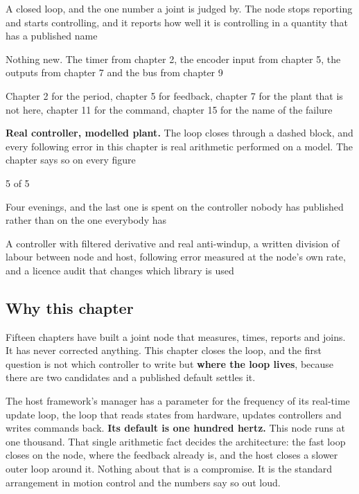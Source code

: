 
\begin{keyfacts}
\item[Adds to the node] A closed loop, and the one number a joint is judged by.
The node stops reporting and starts controlling, and it reports how well it is
controlling in a quantity that has a published name
\item[Peripherals] Nothing new. The timer from chapter 2, the encoder input from
chapter 5, the outputs from chapter 7 and the bus from chapter 9
\item[Depends on] Chapter 2 for the period, chapter 5 for feedback, chapter 7
for the plant that is not here, chapter 11 for the command, chapter 15 for the
name of the failure
\item[Real or modelled] \textbf{Real controller, modelled plant.} The loop
closes through a dashed block, and every following error in this chapter is real
arithmetic performed on a model. The chapter says so on every figure
\item[Difficulty] 5 of 5
\item[Effort] Four evenings, and the last one is spent on the controller nobody
has published rather than on the one everybody has
\item[Deliverable] A controller with filtered derivative and real anti-windup, a
written division of labour between node and host, following error measured at
the node's own rate, and a licence audit that changes which library is used
\end{keyfacts}

\subsection*{Why this chapter}

Fifteen chapters have built a joint node that measures, times, reports and
joins. It has never corrected anything. This chapter closes the loop, and the
first question is not which controller to write but \textbf{where the loop
lives}, because there are two candidates and a published default settles it.

The host framework's manager has a parameter for the frequency of its real-time
update loop, the loop that reads states from hardware, updates controllers and
writes commands back. \textbf{Its default is one hundred hertz.} This node runs
at one thousand. That single arithmetic fact decides the architecture: the fast
loop closes on the node, where the feedback already is, and the host closes a
slower outer loop around it. Nothing about that is a compromise. It is the
standard arrangement in motion control and the numbers say so out loud.

